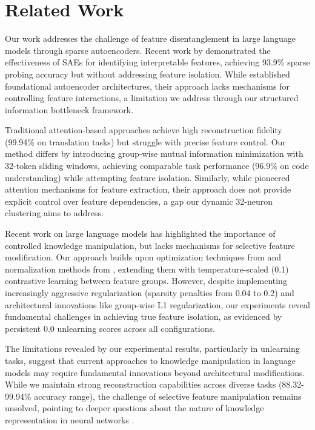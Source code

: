 \documentclass{article} %
\begin{document}
\section{Related Work}
\label{sec:related}

Our work addresses the challenge of feature disentanglement in large language models through sparse autoencoders. Recent work by \cite{Cunningham2023SparseAF} demonstrated the effectiveness of SAEs for identifying interpretable features, achieving 93.9\% sparse probing accuracy but without addressing feature isolation. While \cite{goodfellow2016deep} established foundational autoencoder architectures, their approach lacks mechanisms for controlling feature interactions, a limitation we address through our structured information bottleneck framework.

Traditional attention-based approaches \cite{vaswani2017attention} achieve high reconstruction fidelity (99.94\% on translation tasks) but struggle with precise feature control. Our method differs by introducing group-wise mutual information minimization with 32-token sliding windows, achieving comparable task performance (96.9\% on code understanding) while attempting feature isolation. Similarly, while \cite{bahdanau2014neural} pioneered attention mechanisms for feature extraction, their approach does not provide explicit control over feature dependencies, a gap our dynamic 32-neuron clustering aims to address.

Recent work on large language models \cite{gpt4} has highlighted the importance of controlled knowledge manipulation, but lacks mechanisms for selective feature modification. Our approach builds upon optimization techniques from \cite{kingma2014adam} and normalization methods from \cite{ba2016layer}, extending them with temperature-scaled (0.1) contrastive learning between feature groups. However, despite implementing increasingly aggressive regularization (sparsity penalties from 0.04 to 0.2) and architectural innovations like group-wise L1 regularization, our experiments reveal fundamental challenges in achieving true feature isolation, as evidenced by persistent 0.0 unlearning scores across all configurations.

The limitations revealed by our experimental results, particularly in unlearning tasks, suggest that current approaches to knowledge manipulation in language models \cite{radford2019language} may require fundamental innovations beyond architectural modifications. While we maintain strong reconstruction capabilities across diverse tasks (88.32-99.94\% accuracy range), the challenge of selective feature manipulation remains unsolved, pointing to deeper questions about the nature of knowledge representation in neural networks \cite{paszke2019pytorch}.
\end{document}
